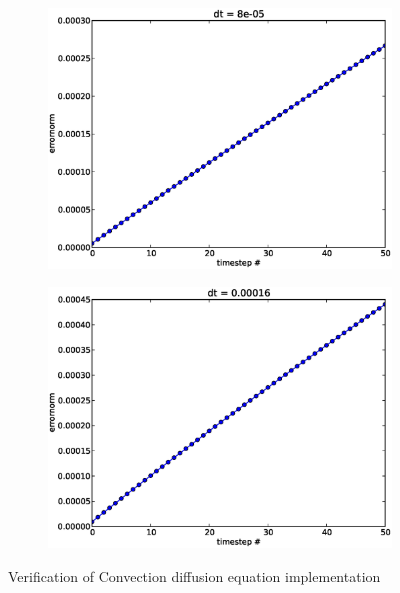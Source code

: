 \begin{figure}[H]
\centering
\begin{subfigure}[b]{0.48\textwidth}
\includegraphics[width=\textwidth]{../doc/results/experiment_05112013_1235/results/deterministic_errorplot.eps}
\caption{}
\label{Verification_convection_diffusion:single_dt}
\end{subfigure}
\begin{subfigure}[b]{0.48\textwidth}
\includegraphics[width=\textwidth]{../doc/results/experiment_05112013_1234/results/deterministic_errorplot.eps}
\caption{}
\label{Verification_convection_diffusion:double_dt}
\end{subfigure}
\caption[Verification of Convection diffusion equation implementation]{Verification of Convection diffusion equation implementation}
\label{Verification_convection_diffusion}
\end{figure}

